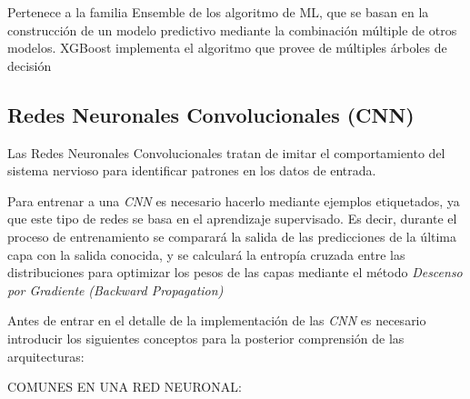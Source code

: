             Pertenece a la familia Ensemble de los algoritmo de ML, que se basan en la construcción de un modelo predictivo mediante la combinación múltiple de otros modelos. XGBoost implementa el algoritmo  que provee de múltiples árboles de decisión

        \subsection {Redes Neuronales Convolucionales (CNN)}

            Las Redes Neuronales Convolucionales tratan de imitar el comportamiento del sistema nervioso para identificar patrones en los datos de entrada.

            Para entrenar a una \textit{CNN} es necesario hacerlo mediante ejemplos etiquetados, ya que este tipo de redes se basa en el aprendizaje supervisado. Es decir, durante el proceso de entrenamiento se comparará la salida de las predicciones de la última capa con la salida conocida, y se calculará la entropía cruzada entre las distribuciones  para optimizar los pesos de las capas mediante el método \textit{Descenso por Gradiente} \textit{(Backward Propagation)}

            Antes de entrar en el detalle de la implementación de las \textit{CNN} es necesario introducir los siguientes conceptos para la posterior comprensión de las arquitecturas:

            COMUNES EN UNA RED NEURONAL:

